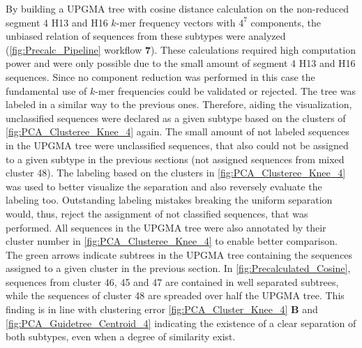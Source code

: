 \newpage

By building a \gls{UPGMA} tree with cosine distance calculation on the non-reduced segment 4 H13 and H16 $k$-mer frequency vectors with $4^7$ components, the unbiased relation of sequences from these subtypes were analyzed (\autoref{fig:Precalc_Pipeline} workflow \textsf{\textbf{7}}). These calculations required high computation power and were only possible due to the small amount of segment 4 H13 and H16 sequences. Since no component reduction was performed in this case the fundamental use of $k$-mer frequencies could be validated or rejected. The tree was labeled in a similar way to the previous ones. Therefore, aiding the visualization, unclassified sequences were declared as a given subtype based on the clusters of \autoref{fig:PCA_Clusteree_Knee_4} again. The small amount of not labeled sequences in the \gls{UPGMA} tree were unclassified sequences, that also could not be assigned to a given subtype in the previous sections (not assigned sequences from mixed cluster 48). The labeling based on the clusters in \autoref{fig:PCA_Clusteree_Knee_4} was used to better visualize the separation and also reversely evaluate the labeling too. Outstanding labeling mistakes breaking the uniform separation would, thus, reject the assignment of not classified sequences, that was performed. All sequences in the \gls{UPGMA} tree were also annotated by their cluster number in \autoref{fig:PCA_Clusteree_Knee_4} to enable better comparison. The green arrows indicate subtrees in the \gls{UPGMA} tree containing the sequences assigned to a given cluster in the previous section. In \autoref{fig:Precalculated_Cosine}, sequences from cluster 46, 45 and 47 are contained in well separated subtrees, while the sequences of cluster 48 are spreaded over half the \gls{UPGMA} tree. This finding is in line with clustering error \autoref{fig:PCA_Cluster_Knee_4} \textbf{\textsf{B}} and \autoref{fig:PCA_Guidetree_Centroid_4} indicating the existence of a clear separation of both subtypes, even when a degree of similarity exist.

